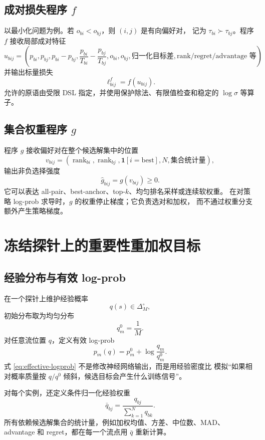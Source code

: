 \documentclass[UTF8,11pt]{ctexart}
\newcommand{\simplex}{\Delta_M^\circ}
\begin{document}
\subsection{成对损失程序 \(f\)}

以最小化问题为例。若 \(o_{bi}<o_{bj}\)，则 \((i,j)\) 是有向偏好对，
记为 \(\tau_{bi}\succ\tau_{bj}\)。程序 \(f\) 接收局部成对特征
\[
    u_{bij}
    =
    \left(
    p_{bi},p_{bj},
    p_{bi}-p_{bj},
    \frac{p_{bi}}{T_{bi}}-\frac{p_{bj}}{T_{bj}},
    o_{bi},o_{bj},
    \text{归一化目标差},
    \text{rank/regret/advantage 等}
    \right)
\]
并输出标量损失
\[
    \ell^f_{bij}=f(u_{bij}).
\]
允许的原语由受限 DSL 指定，并使用保护除法、有限值检查和稳定的
\(\log\sigma\) 等算子。

\subsection{集合权重程序 \(g\)}

程序 \(g\) 接收偏好对在整个候选解集中的位置
\[
    v_{bij}
    =
    \left(
    \operatorname{rank}_{bi},
    \operatorname{rank}_{bj},
    \mathbf 1[i=\text{best}],
    N,\text{集合统计量}
    \right),
\]
输出非负选择强度
\[
    \widehat g_{bij}=g(v_{bij})\ge0.
\]
它可以表达 all-pair、best-anchor、top-\(k\)、均匀排名采样或连续软权重。
在对策略 log-prob 求导时，\(g\) 的权重停止梯度；它负责选对和加权，
而不通过权重分支额外产生策略梯度。

\section{冻结探针上的重要性重加权目标}

\subsection{经验分布与有效 log-prob}

在一个探针上维护经验概率
\[
    q(s)\in\simplex,
\]
初始分布取为均匀分布
\[
    q_m^0=\frac1M.
\]
对任意流位置 \(q\)，定义有效 log-prob
\[
    p_m(q)
    =
    p_m^0
    +
    \log\frac{q_m}{q_m^0}.
    \label{eq:effective-logprob}
\]
式 \eqref{eq:effective-logprob} 不是修改神经网络输出，而是用经验密度比
模拟“如果相对概率质量按 \(q/q^0\) 倾斜，候选目标会产生什么训练信号”。

对每个实例，还定义条件归一化经验权重
\[
    \bar q_{bj}
    =
    \frac{q_{bj}}{\sum_{k=1}^{N}q_{bk}}.
\]
所有依赖候选解集合的统计量，例如加权均值、方差、中位数、MAD、
advantage 和 regret，都在每一个流点用 \(\bar q\) 重新计算。
\end{document}
